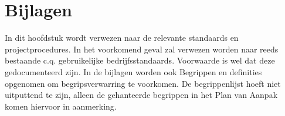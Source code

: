 \section{Bijlagen}
In dit hoofdstuk wordt verwezen naar de relevante standaards en projectprocedures.
In het voorkomend geval zal verwezen worden naar reeds bestaande c.q. gebruikelijke bedrijfsstandaards.
Voorwaarde is wel dat deze gedocumenteerd zijn.
In de bijlagen worden ook Begrippen en definities opgenomen om begripsverwarring te voorkomen.
De begrippenlijst hoeft niet uitputtend te zijn, alleen de gehanteerde begrippen in het Plan van Aanpak komen hiervoor in aanmerking.

